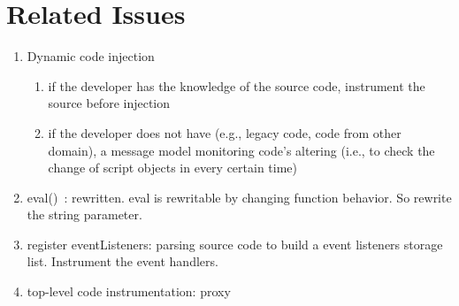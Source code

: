 \documentclass[a4paper,twocolumn,10pt]{article}
\def\denseitems{
  \itemsep1pt plus1pt minus1pt
  \parsep0pt plus0pt
  \parskip0pt\topsep0pt}
\begin{document}
\section{Related Issues}\label{sec_relatedIssues}
\begin{enumerate}\denseitems
    \item Dynamic code injection
        \begin{enumerate}\denseitems
            \item if the developer has the knowledge of the source code, instrument the source before injection
            \item if the developer does not have (e.g., legacy code, code from other domain), a message model monitoring code's altering (i.e., to check the change of script objects in every certain time)
        \end{enumerate}


    \item eval()~\label{eval}: rewritten. eval is rewritable by changing function behavior. So rewrite the string parameter.

    \item register eventListeners: parsing source code to build a event listeners storage list. Instrument the event handlers.

    \item top-level code instrumentation: proxy

\end{enumerate}
\end{document}
